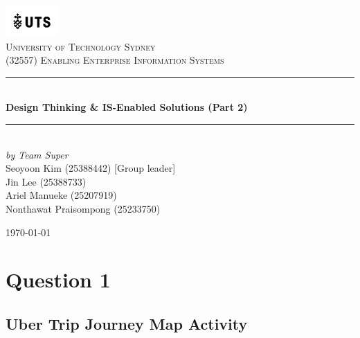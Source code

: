 \documentclass[12pt,a4paper]{article}
\begin{document}

\begin{titlepage}

\newcommand{\HRule}{\rule{\linewidth}{0.5mm}}
\center

\vspace*{1\baselineskip}
\includegraphics[width=0.15\textwidth]{images/UTS.png}\\
\textsc{\LARGE University of Technology Sydney}\\[2.0cm]
\textsc{\Large (32557) Enabling Enterprise Information Systems}\\[0.4cm]

\HRule\\[0.6cm]
{\huge\bfseries Design Thinking \& IS-Enabled Solutions (Part 2) }\\[0.4cm]
\HRule\\[10cm]

\emph{by Team Super} \\
{ Seoyoon Kim (25388442) [Group leader] \\}
{ Jin Lee (25388733)  \\}
{ Ariel Manueke (25207919) \\}
{ Nonthawat Praisompong (25233750) \\}

\vfill
{\large\today}

\vfill

\end{titlepage}


\tableofcontents
\thispagestyle{nofooter}
\cleardoublepage

\pagebreak




\setcounter{page}{1}

\section{Question 1}
\subsection{Uber Trip Journey Map Activity} 
\end{document}
